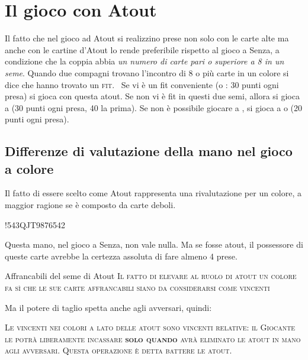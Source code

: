 \documentclass[../corsofiori.tex]{subfiles}
\begin{document}
\chapter{Il gioco con Atout}
Il fatto che nel gioco ad Atout si realizzino prese non solo con le carte alte ma anche con le cartine d'Atout lo rende
preferibile rispetto al gioco a Senza, a condizione che la coppia abbia \emph{un numero di carte pari o superiore a 8 in
un seme}. Quando due compagni trovano l'incontro di 8 o più carte in un colore si dice che hanno trovato un
\textsc{fit}.
\
Se vi è un fit conveniente (\Sp o \He{}: 30 punti ogni presa) si
gioca con questa atout. Se non vi è fit in questi due semi, allora si gioca a \SA (30 punti ogni presa, 40 la prima). Se
non è possibile giocare a \SA, si gioca a \Di o \Cl\sidefootnote{Questi colori si dicono \emph{minori}.} (20 punti ogni presa).

\section{Differenze di valutazione della mano nel gioco a colore}

Il fatto di essere scelto come Atout rappresenta una rivalutazione per un colore, a maggior ragione se è composto da
carte deboli.

\hand*!{543}{QJT987}{654}{2}

Questa mano, nel gioco a Senza, non vale nulla. Ma se \cu fosse atout, il possessore di queste carte avrebbe la certezza
assoluta di fare almeno 4 prese.
\begin{regola}{Affrancabili del seme di Atout}
    \textsc{Il fatto di elevare al ruolo di atout un colore fa sì che le sue carte affrancabili siano da considerarsi
    come vincenti}
\end{regola}
Ma il potere di taglio spetta anche agli avversari, quindi:

\begin{regola}
    \textsc{Le vincenti nei colori a lato delle atout sono vincenti relative: il Giocante le potrà liberamente incassare
    \textbf{solo quando} avrà eliminato le atout in mano agli avversari. Questa operazione è detta battere le atout.}
\end{regola}

\newgame
{}
\leftupper{\boardtext*}%
{\dealertext\quad}{\vulnertext}
\end{document}
